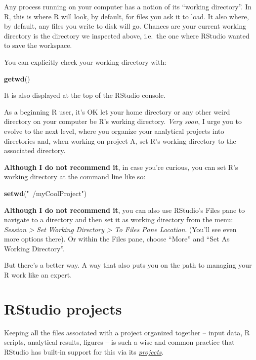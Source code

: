 \documentclass[
]{book}
\newenvironment{Shaded}{\begin{snugshade}}{\end{snugshade}}
\newcommand{\KeywordTok}[1]{\textcolor[rgb]{0.13,0.29,0.53}{\textbf{#1}}}
\newcommand{\NormalTok}[1]{#1}
\newcommand{\StringTok}[1]{\textcolor[rgb]{0.31,0.60,0.02}{#1}}
\begin{document}
Any process running on your computer has a notion of its ``working directory''. In R, this is where R will look, by default, for files you ask it to load. It also where, by default, any files you write to disk will go. Chances are your current working directory is the directory we inspected above, i.e.~the one where RStudio wanted to save the workspace.

You can explicitly check your working directory with:

\begin{Shaded}
\begin{Highlighting}[]
\KeywordTok{getwd}\NormalTok{()}
\end{Highlighting}
\end{Shaded}

It is also displayed at the top of the RStudio console.

As a beginning R user, it's OK let your home directory or any other weird directory on your computer be R's working directory. \emph{Very soon}, I urge you to evolve to the next level, where you organize your analytical projects into directories and, when working on project A, set R's working directory to the associated directory.

\textbf{Although I do not recommend it}, in case you're curious, you can set R's working directory at the command line like so:

\begin{Shaded}
\begin{Highlighting}[]
\KeywordTok{setwd}\NormalTok{(}\StringTok{"~/myCoolProject"}\NormalTok{)}
\end{Highlighting}
\end{Shaded}

\textbf{Although I do not recommend it}, you can also use RStudio's Files pane to navigate to a directory and then set it as working directory from the menu: \emph{Session \textgreater{} Set Working Directory \textgreater{} To Files Pane Location}. (You'll see even more options there). Or within the Files pane, choose ``More'' and ``Set As Working Directory''.

But there's a better way. A way that also puts you on the path to managing your R work like an expert.

\hypertarget{rprojs}{%
\section{RStudio projects}\label{rprojs}}

Keeping all the files associated with a project organized together -- input data, R scripts, analytical results, figures -- is such a wise and common practice that RStudio has built-in support for this via its \href{https://support.rstudio.com/hc/en-us/articles/200526207-Using-Projects}{\emph{projects}}.
\end{document}
